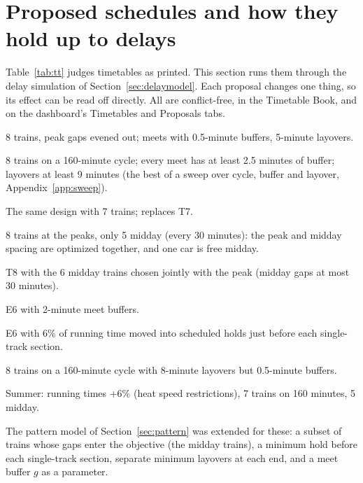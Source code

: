 \documentclass[11pt]{article}
\begin{document}
\clearpage
\section{Proposed schedules and how they hold up to delays}\label{sec:prop}
Table~\ref{tab:tt} judges timetables as printed. This section runs them through the delay simulation of Section~\ref{sec:delaymodel}. Each proposal changes one thing, so its effect can be read off directly. All are conflict-free, in the Timetable Book, and on the dashboard's Timetables and Proposals tabs.
\begin{description}[itemsep=1pt]
\item[T8] 8 trains, peak gaps evened out; meets with 0.5-minute buffers, 5-minute layovers.
\item[B8] 8 trains on a 160-minute cycle; every meet has at least 2.5 minutes of buffer; layovers at least 9 minutes (the best of a sweep over cycle, buffer and layover, Appendix~\ref{app:sweep}).
\item[B7] The same design with 7 trains; replaces T7.
\item[E5] 8 trains at the peaks, only 5 midday (every 30 minutes): the peak and midday spacing are optimized together, and one car is free midday.
\item[E6] T8 with the 6 midday trains chosen jointly with the peak (midday gaps at most 30 minutes).
\item[G8] E6 with 2-minute meet buffers.
\item[S8] E6 with 6\% of running time moved into scheduled holds just before each single-track section.
\item[R8] 8 trains on a 160-minute cycle with 8-minute layovers but 0.5-minute buffers.
\item[W7] Summer: running times +6\% (heat speed restrictions), 7 trains on 160 minutes, 5 midday.
\end{description}
The pattern model of Section~\ref{sec:pattern} was extended for these: a subset of trains whose gaps enter the objective (the midday trains), a minimum hold before each single-track section, separate minimum layovers at each end, and a meet buffer $g$ as a parameter.
\end{document}
